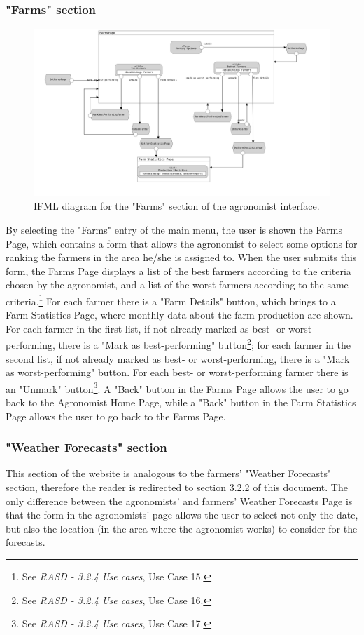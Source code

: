 \documentclass{article}
\begin{document}
\subsubsection{"Farms" section}
\begin{figure}[H]
    \centering
     \includegraphics[scale=0.1]{diagrams/ui diagrams/agronomist/farms.png} 
    \caption{IFML diagram for the "Farms" section of the agronomist interface.}
\end{figure}
By selecting the "Farms" entry of the main menu, the user is shown the Farms Page, which contains a form that allows the agronomist to select some options for ranking the farmers in the area he/she is assigned to. When the user submits this form, the Farms Page displays a list of the best farmers according to the criteria chosen by the agronomist, and a list of the worst farmers according to the same criteria.\footnote{See \textit{RASD - 3.2.4 Use cases}, Use Case 15.} For each farmer there is a "Farm Details" button, which brings to a Farm Statistics Page, where monthly data about the farm production are shown. For each farmer in the first list, if not already marked as best- or worst-performing, there is a "Mark as best-performing" button\footnote{See \textit{RASD - 3.2.4 Use cases}, Use Case 16.}; for each farmer in the second list, if not already marked as best- or worst-performing, there is a "Mark as worst-performing" button. For each best- or worst-performing farmer there is an "Unmark" button\footnote{See \textit{RASD - 3.2.4 Use cases}, Use Case 17.}. \newline
A "Back" button in the Farms Page allows the user to go back to the Agronomist Home Page, while a "Back" button in the Farm Statistics Page allows the user to go back to the Farms Page.

\subsubsection{"Weather Forecasts" section}
This section of the website is analogous to the farmers' "Weather Forecasts" section, therefore the reader is redirected to section 3.2.2 of this document. The only difference between the agronomists' and farmers' Weather Forecasts Page is that the form in the agronomists' page allows the user to select not only the date, but also the location (in the area where the agronomist works) to consider for the forecasts.
\end{document}
